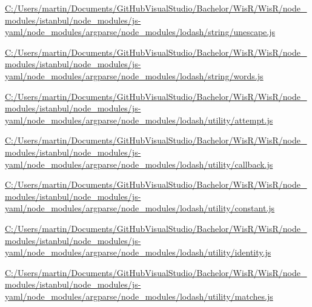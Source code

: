 \begin{DoxyCompactItemize}
\item 
\hyperlink{_c_1_2_users_2martin_2_documents_2_git_hub_visual_studio_2_bachelor_2_wis_r_2_wis_r_2node_moduled58ad10f3245c8c0342d5b27a8732b3a}{C\+:/\+Users/martin/\+Documents/\+Git\+Hub\+Visual\+Studio/\+Bachelor/\+Wis\+R/\+Wis\+R/node\+\_\+modules/istanbul/node\+\_\+modules/js-\/yaml/node\+\_\+modules/argparse/node\+\_\+modules/lodash/string/unescape.\+js}
\item 
\hyperlink{_c_1_2_users_2martin_2_documents_2_git_hub_visual_studio_2_bachelor_2_wis_r_2_wis_r_2node_moduleacb465aa077df35f476c5ebd190c3ea0}{C\+:/\+Users/martin/\+Documents/\+Git\+Hub\+Visual\+Studio/\+Bachelor/\+Wis\+R/\+Wis\+R/node\+\_\+modules/istanbul/node\+\_\+modules/js-\/yaml/node\+\_\+modules/argparse/node\+\_\+modules/lodash/string/words.\+js}
\item 
\hyperlink{_c_1_2_users_2martin_2_documents_2_git_hub_visual_studio_2_bachelor_2_wis_r_2_wis_r_2node_module4e04f3b02586d18bec5cd7485b5185ec}{C\+:/\+Users/martin/\+Documents/\+Git\+Hub\+Visual\+Studio/\+Bachelor/\+Wis\+R/\+Wis\+R/node\+\_\+modules/istanbul/node\+\_\+modules/js-\/yaml/node\+\_\+modules/argparse/node\+\_\+modules/lodash/utility/attempt.\+js}
\item 
\hyperlink{_c_1_2_users_2martin_2_documents_2_git_hub_visual_studio_2_bachelor_2_wis_r_2_wis_r_2node_moduleee81e05814e833cfac1ba7275d5e1502}{C\+:/\+Users/martin/\+Documents/\+Git\+Hub\+Visual\+Studio/\+Bachelor/\+Wis\+R/\+Wis\+R/node\+\_\+modules/istanbul/node\+\_\+modules/js-\/yaml/node\+\_\+modules/argparse/node\+\_\+modules/lodash/utility/callback.\+js}
\item 
\hyperlink{_c_1_2_users_2martin_2_documents_2_git_hub_visual_studio_2_bachelor_2_wis_r_2_wis_r_2node_module5be4bf39274b197f3683583b482280e0}{C\+:/\+Users/martin/\+Documents/\+Git\+Hub\+Visual\+Studio/\+Bachelor/\+Wis\+R/\+Wis\+R/node\+\_\+modules/istanbul/node\+\_\+modules/js-\/yaml/node\+\_\+modules/argparse/node\+\_\+modules/lodash/utility/constant.\+js}
\item 
\hyperlink{_c_1_2_users_2martin_2_documents_2_git_hub_visual_studio_2_bachelor_2_wis_r_2_wis_r_2node_module1c6ff0bc6da7fced4c6745dc552baba2}{C\+:/\+Users/martin/\+Documents/\+Git\+Hub\+Visual\+Studio/\+Bachelor/\+Wis\+R/\+Wis\+R/node\+\_\+modules/istanbul/node\+\_\+modules/js-\/yaml/node\+\_\+modules/argparse/node\+\_\+modules/lodash/utility/identity.\+js}
\item 
\hyperlink{_c_1_2_users_2martin_2_documents_2_git_hub_visual_studio_2_bachelor_2_wis_r_2_wis_r_2node_moduleffff9e04ad5a6adbd4fe6408b03a9bd5}{C\+:/\+Users/martin/\+Documents/\+Git\+Hub\+Visual\+Studio/\+Bachelor/\+Wis\+R/\+Wis\+R/node\+\_\+modules/istanbul/node\+\_\+modules/js-\/yaml/node\+\_\+modules/argparse/node\+\_\+modules/lodash/utility/matches.\+js}

\end{DoxyCompactItemize}
